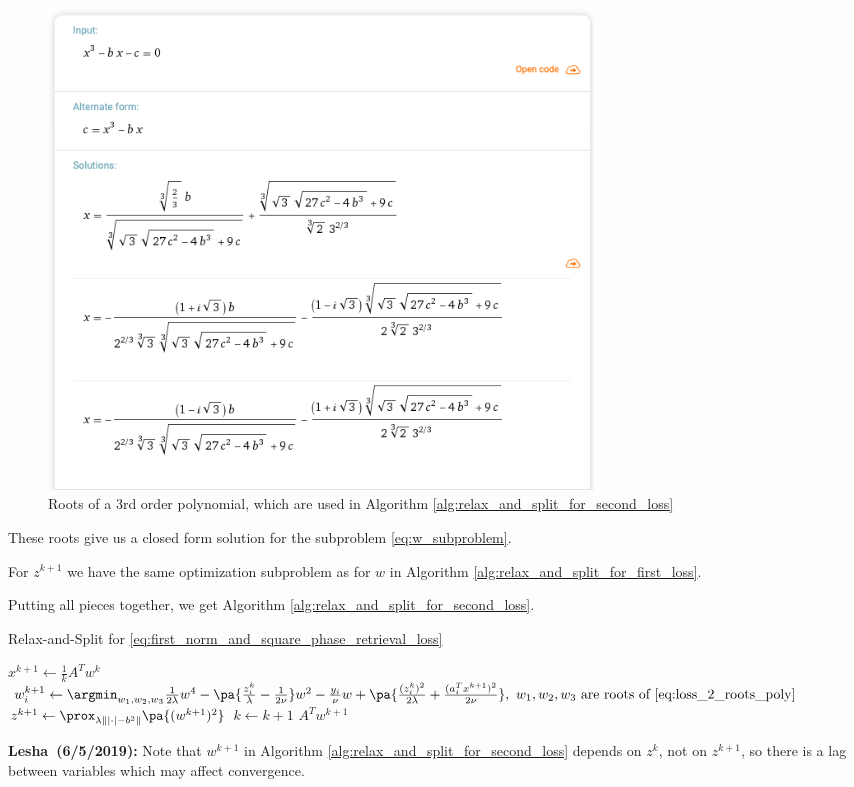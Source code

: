 \documentclass[11pt,letterpaper]{article}
\newcommand{\userId}{Lesha}
\newcommand{\Lesha}[1]{\textbf{\userId\ (#1):}}
\numberwithin{equation}{section} %
\numberwithin{figure}{section} %
\numberwithin{table}{section} %
\begin{document}
\begin{figure}[h!]
    \centering
    \includegraphics[width=0.7\textwidth]{images/roots}
    \caption{\label{fig:roots} Roots of a 3rd order polynomial, which are used in Algorithm \ref{alg:relax_and_split_for_second_loss}}
\end{figure}

These roots give us a closed form solution for the subproblem \ref{eq:w_subproblem}. 

For $z^{k+1}$ we have the same optimization subproblem as for $w$ in Algorithm \ref{alg:relax_and_split_for_first_loss}.

Putting all pieces together, we get Algorithm \ref{alg:relax_and_split_for_second_loss}.

\begin{algorithm}
    \caption{Relax-and-Split for \ref{eq:first_norm_and_square_phase_retrieval_loss}}
    \label{alg:relax_and_split_for_second_loss}
    \begin{algorithmic}[1]
            \State $x^{k+1} \gets \frac{1}{k}A^Tw^{k}$ 
            \State $w^{k+1}_i \gets \argmin_{w_1, w_2, w_3} \frac{1}{2\lambda}w^4 - \pa{\frac{z_i^{k}}{\lambda} - \frac{1}{2\nu}}w^2 - \frac{y_i}{\nu}w + \pa{\frac{(z_i^{k})^2}{2\lambda} + \frac{(a_i^Tx^{k+1})^2}{2\nu}},\ w_1, w_2, w_3 \text{ are roots of \ref{eq:loss_2_roots_poly}}$
            \State $z^{k+1} \gets \prox_{\lambda\||\cdot| - b^2\|}\pa{(w^{k+1})^2}$ 
            \State $k \gets k+1$
        \EndWhile
        \Return $A^Tw^{k+1}$
    \end{algorithmic}
\end{algorithm}

\begin{tip}
\Lesha{6/5/2019} Note that $w^{k+1}$ in Algorithm \ref{alg:relax_and_split_for_second_loss} depends on $z^k$, not on $z^{k+1}$, so there is a lag between variables which may affect convergence. 
\end{tip}
\end{document}
